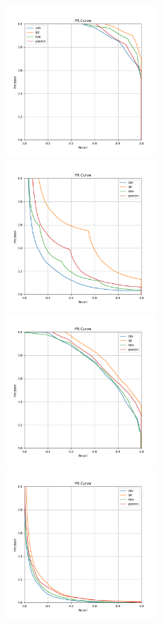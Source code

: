 \begin{figure}[h!]
    \includegraphics[width=0.5\textwidth]{../images/toyexperiments/prcurves/PRCurve_k4_s1.png} 
    \includegraphics[width=0.5\textwidth]{../images/toyexperiments/prcurves/PRCurve_k4_s3.png}
    \includegraphics[width=0.5\textwidth]{../images/toyexperiments/prcurves/PRCurve_ksqrt_s1.png} 
    \includegraphics[width=0.5\textwidth]{../images/toyexperiments/prcurves/PRCurve_ksqrt_s3.png} 
\end{figure}


